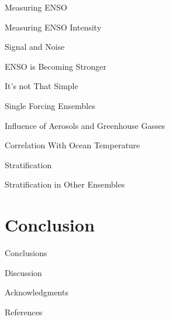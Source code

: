\documentclass{beamer}
\begin{document}
\begin{frame}{Measuring ENSO}

\end{frame}

\begin{frame}{Measuring ENSO Intensity}

\end{frame}

\begin{frame}{Signal and Noise}

\end{frame}

\begin{frame}{ENSO is Becoming Stronger}

\end{frame}

\begin{frame}{It's not That Simple}

\end{frame}

\begin{frame}{Single Forcing Ensembles}

\end{frame}

\begin{frame}{Influence of Aerosols and Greenhouse Gasses}

\end{frame}

\begin{frame}{Correlation With Ocean Temperature}

\end{frame}

\begin{frame}{Stratification}

\end{frame}

\begin{frame}{Stratification in Other Ensembles}

\end{frame}

\section{Conclusion}

\begin{frame}{Conclusions}

\end{frame}

\begin{frame}{Discussion}

\end{frame}

\begin{frame}{Acknowledgments}

\end{frame}

\begin{frame}{References}
  
  
\end{frame}

\maketitle
\end{document}
